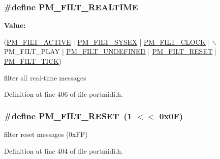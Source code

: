 \subsubsection[{\texorpdfstring{P\+M\+\_\+\+F\+I\+L\+T\+\_\+\+R\+E\+A\+L\+T\+I\+ME}{PM_FILT_REALTIME}}]{\setlength{\rightskip}{0pt plus 5cm}\#define P\+M\+\_\+\+F\+I\+L\+T\+\_\+\+R\+E\+A\+L\+T\+I\+ME}\hypertarget{group__grp__events__filters_ga20f84601b1fc10c18339cf85bf9b91e9}{}\label{group__grp__events__filters_ga20f84601b1fc10c18339cf85bf9b91e9}
{\bfseries Value\+:}
\begin{DoxyCode}
(\hyperlink{group__grp__events__filters_ga14df46b4e5e3aa265dc8dee06df8ce19}{PM\_FILT\_ACTIVE} | \hyperlink{group__grp__events__filters_ga3ef53d51914740bb7746e017b5a44402}{PM\_FILT\_SYSEX} | \hyperlink{group__grp__events__filters_gaf6d54a9ff867bab06ee18bc637887834}{PM\_FILT\_CLOCK} | \(\backslash\)
    PM\_FILT\_PLAY | \hyperlink{group__grp__events__filters_ga4ee575e9f8ba7bf24e53919cfe81edab}{PM\_FILT\_UNDEFINED} | \hyperlink{group__grp__events__filters_gaf398203a8c838897bd07dc356cd9ed54}{PM\_FILT\_RESET} | 
      \hyperlink{group__grp__events__filters_gaa4de938a93a84d9d06cc5173f4277595}{PM\_FILT\_TICK})
\end{DoxyCode}
filter all real-\/time messages 

Definition at line 406 of file portmidi.\+h.

\subsubsection[{\texorpdfstring{P\+M\+\_\+\+F\+I\+L\+T\+\_\+\+R\+E\+S\+ET}{PM_FILT_RESET}}]{\setlength{\rightskip}{0pt plus 5cm}\#define P\+M\+\_\+\+F\+I\+L\+T\+\_\+\+R\+E\+S\+ET~(1 $<$$<$ 0x0\+F)}\hypertarget{group__grp__events__filters_gaf398203a8c838897bd07dc356cd9ed54}{}\label{group__grp__events__filters_gaf398203a8c838897bd07dc356cd9ed54}
filter reset messages (0x\+FF) 

Definition at line 404 of file portmidi.\+h.

